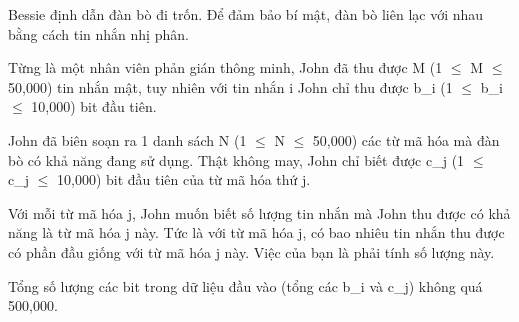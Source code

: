 Bessie định dẫn đàn bò đi trốn. Để đảm bảo bí mật, đàn bò liên lạc với nhau bằng cách tin nhắn nhị phân.  

   Từng là một nhân viên phản gián thông minh, John đã thu được M  (1  $\le$  M  $\le$  50,000) tin nhắn mật, tuy nhiên với tin nhắn i John chỉ  thu được b\_i (1  $\le$  b\_i  $\le$  10,000) bit đầu tiên.  

   John đã biên soạn ra 1 danh sách N (1  $\le$  N  $\le$  50,000) các từ mã hóa mà đàn bò có khả năng đang sử dụng. Thật không may, John chỉ biết  được c\_j (1  $\le$  c\_j  $\le$  10,000) bit đầu tiên của từ mã hóa thứ j.  

   Với mỗi từ mã hóa j, John muốn biết số lượng tin nhắn mà John  thu được có khả năng là từ mã hóa j này. Tức là với từ mã hóa j, có bao  nhiêu tin nhắn thu được có phần đầu giống với từ mã hóa j này. Việc  của bạn là phải tính số lượng này.  

   Tổng số lượng các bit trong dữ liệu đầu vào (tổng các b\_i và c\_j) không quá 500,000.